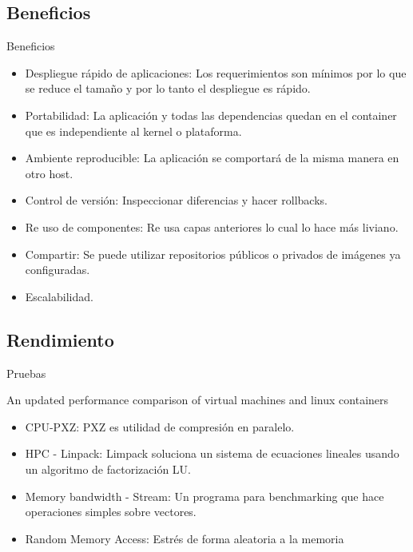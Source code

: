 \documentclass[compress]{beamer}
\begin{document}
\subsection{Beneficios}

\begin{frame}{Beneficios}
	\begin{itemize}
		\item Despliegue rápido de aplicaciones: Los requerimientos son mínimos por lo que se reduce el tamaño y por lo tanto el despliegue es rápido.
		\item Portabilidad: La aplicación y todas las dependencias quedan en el container que es independiente al kernel o plataforma.
		\item Ambiente reproducible: La aplicación se comportará de la misma manera en otro host.
		\item Control de versión: Inspeccionar diferencias y hacer rollbacks.
		\item Re uso de componentes: Re usa capas anteriores lo cual lo hace más liviano.
		\item Compartir: Se puede utilizar repositorios públicos o privados de imágenes ya configuradas.
		\item Escalabilidad.
	\end{itemize}
\end{frame}

\subsection{Rendimiento}



\begin{frame}{Pruebas}

An updated performance comparison of virtual machines and linux containers \cite{felter2014updated}
\begin{itemize}
	\item CPU-PXZ: PXZ es utilidad de compresión en paralelo. 
	\item HPC - Linpack: Limpack soluciona un sistema de ecuaciones lineales usando un algoritmo de factorización LU.
	\item Memory bandwidth - Stream: Un programa para benchmarking que hace operaciones simples sobre vectores.
	\item Random Memory Access: Estrés de forma aleatoria a la memoria 
\end{itemize}
\end{frame}
\end{document}
